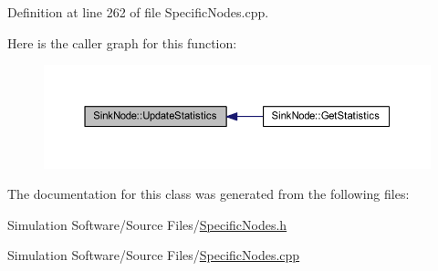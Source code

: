 Definition at line 262 of file Specific\+Nodes.\+cpp.

Here is the caller graph for this function\+:
\nopagebreak
\begin{figure}[H]
\begin{center}
\leavevmode
\includegraphics[width=350pt]{class_sink_node_adf5f0001fd1d3d61725ff6a6f5b40ba7_icgraph}
\end{center}
\end{figure}


The documentation for this class was generated from the following files\+:\begin{DoxyCompactItemize}
\item 
Simulation Software/\+Source Files/\hyperlink{_specific_nodes_8h}{Specific\+Nodes.\+h}\item 
Simulation Software/\+Source Files/\hyperlink{_specific_nodes_8cpp}{Specific\+Nodes.\+cpp}\end{DoxyCompactItemize}
